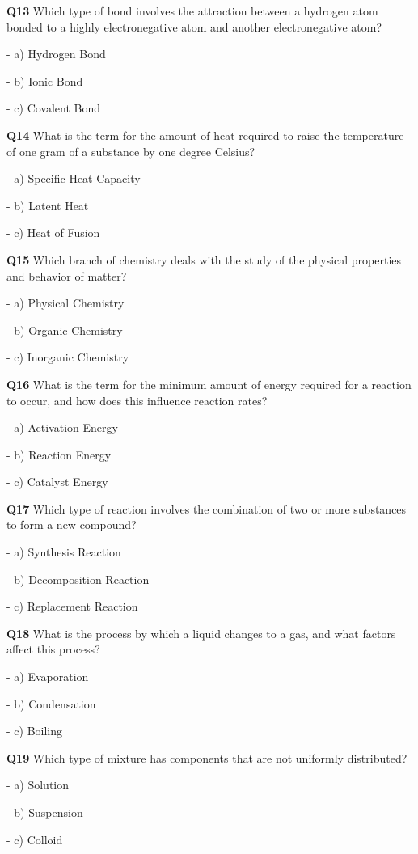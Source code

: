 \textbf{Q13} Which type of bond involves the attraction between a hydrogen atom bonded to a highly electronegative atom and another electronegative atom?\par
\quad - a) Hydrogen Bond\par
\quad - b) Ionic Bond\par
\quad - c) Covalent Bond\par

\textbf{Q14} What is the term for the amount of heat required to raise the temperature of one gram of a substance by one degree Celsius?\par
\quad - a) Specific Heat Capacity\par
\quad - b) Latent Heat\par
\quad - c) Heat of Fusion\par

\textbf{Q15} Which branch of chemistry deals with the study of the physical properties and behavior of matter?\par
\quad - a) Physical Chemistry\par
\quad - b) Organic Chemistry\par
\quad - c) Inorganic Chemistry\par

\textbf{Q16} What is the term for the minimum amount of energy required for a reaction to occur, and how does this influence reaction rates?\par
\quad - a) Activation Energy\par
\quad - b) Reaction Energy\par
\quad - c) Catalyst Energy\par

\textbf{Q17} Which type of reaction involves the combination of two or more substances to form a new compound?\par
\quad - a) Synthesis Reaction\par
\quad - b) Decomposition Reaction\par
\quad - c) Replacement Reaction\par

\textbf{Q18} What is the process by which a liquid changes to a gas, and what factors affect this process?\par
\quad - a) Evaporation\par
\quad - b) Condensation\par
\quad - c) Boiling\par

\textbf{Q19} Which type of mixture has components that are not uniformly distributed?\par
\quad - a) Solution\par
\quad - b) Suspension\par
\quad - c) Colloid\par

